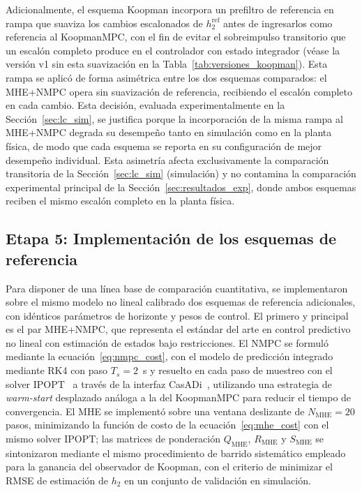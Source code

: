 \documentclass[12pt,letterpaper]{article}
\begin{document}
Adicionalmente, el esquema Koopman incorpora un prefiltro de
referencia en rampa que suaviza los cambios escalonados de
$h_2^{\mathrm{ref}}$ antes de ingresarlos como referencia al
KoopmanMPC, con el fin de evitar el sobreimpulso transitorio que
un escalón completo produce en el controlador con estado integrador
(véase la versión v1 sin esta suavización en la
Tabla~\ref{tab:versiones_koopman}). Esta rampa se aplicó de forma
asimétrica entre los dos esquemas comparados: el MHE+NMPC opera
sin suavización de referencia, recibiendo el escalón completo en
cada cambio. Esta decisión, evaluada experimentalmente en la
Sección~\ref{sec:lc_sim}, se justifica porque la incorporación de
la misma rampa al MHE+NMPC degrada su desempeño tanto en
simulación como en la planta física, de modo que cada esquema se
reporta en su configuración de mejor desempeño individual. Esta
asimetría afecta exclusivamente la comparación transitoria de la
Sección~\ref{sec:lc_sim} (simulación) y no contamina la
comparación experimental principal de la
Sección~\ref{sec:resultados_exp}, donde ambos esquemas reciben el
mismo escalón completo en la planta física.

\subsection{Etapa 5: Implementación de los esquemas de referencia}
\label{sec:benchmarks}

Para disponer de una línea base de comparación cuantitativa, se 
implementaron sobre el mismo modelo no lineal calibrado dos esquemas de 
referencia adicionales, con idénticos parámetros de horizonte y pesos de 
control. El primero y principal es el par MHE+NMPC, que representa el 
estándar del arte en control predictivo no lineal con estimación de 
estados bajo restricciones. El NMPC se formuló mediante la 
ecuación~\eqref{eq:nmpc_cost}, con el modelo de predicción integrado 
mediante RK4 con paso $T_s = 2$~s y resuelto en cada paso de muestreo 
con el solver IPOPT~\cite{wachter2006} a través de la interfaz 
CasADi~\cite{andersson2019}, utilizando una estrategia de 
\textit{warm-start} desplazado análoga a la del KoopmanMPC para reducir 
el tiempo de convergencia. El MHE se implementó sobre una ventana deslizante 
de $N_{\mathrm{MHE}} = 20$ pasos, minimizando la función de costo de la 
ecuación~\eqref{eq:mhe_cost} con el mismo solver IPOPT; las matrices de 
ponderación $Q_{\mathrm{MHE}}$, $R_{\mathrm{MHE}}$ y $S_{\mathrm{MHE}}$ 
se sintonizaron mediante el mismo procedimiento de barrido sistemático 
empleado para la ganancia del observador de Koopman, con el criterio de 
minimizar el RMSE de estimación de $h_2$ en un conjunto de validación 
en simulación.
\end{document}
